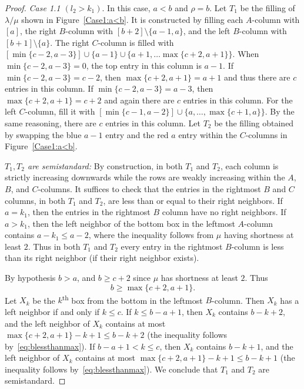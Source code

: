 \documentclass[ALCO,ThmDefs,Unicode,epreuves]{cedram}
\let\hypertargeta\hypertarget %
\newenvironment{Case}[1]{\par\vskip2pt\noindent%
\emph{#1}.}{\vskip2pt}
\begin{document}
\begin{proof}
\begin{Case}
{\hypertargeta{theo3.13_case1.1}{Case 1.1} $(l_2 > k_1)$} In this case, $a<b$ and $\rho = b$. Let $T_1$ be the filling of $\lambda/\mu$ shown in Figure~\ref{Case1:a<b}. It is constructed by filling each $A$-column with $[a]$, the right $B$-column with $[b+2]\setminus \{a-1,a\}$, and the left $B$-column with $[b+1]\setminus \{a\}$. The right $C$-column is filled with $[\min\{c-2,a-3\}] \cup \{a-1\} \cup \{a+1,\ldots \max\{c+2,a+1\}\}$. When $\min\{c-2,a-3\}= 0$, the top entry in this column is $a-1$. If $\min\{c-2,a-3\} = c-2$, then $\max\{c+2,a+1\} = a+1$ and thus there are $c$ entries in this column. If $\min\{c-2,a-3\} = a-3$, then $\max\{c+2,a+1\} = c+2$ and again there are $c$ entries in this column. For the left $C$-column, fill it with $[\min\{c-1,a-2\}]\cup \{a,\ldots, \max\{c+1,a\}\}$. By the same reasoning, there are $c$ entries in this column. Let $T_2$ be the filling obtained by swapping the blue $a-1$ entry and the red $a$ entry within the $C$-columns in Figure~\ref{Case1:a<b}. 

\emph{$T_1, T_2$ are semistandard:} By construction, in both $T_1$ and $T_2$, each column is strictly increasing downwards while the rows are weakly increasing within the $A$, $B$, and $C$-columns. It suffices to check that the entries in the rightmost $B$ and $C$ columns, in both $T_1$ and $T_2$, are less than or equal to their right neighbors. If $a=k_1$, then the entries in the rightmost $B$ column have no right neighbors. If $a > k_1$, then the left neighbor of the bottom box in the leftmost $A$-column contains $a - k_1 \leq a - 2$, where the inequality follows from $\mu$ having shortness at least $2$. Thus in both $T_1$ and $T_2$ every entry in the rightmost $B$-column is less than its right neighbor (if their right neighbor exists). 

By hypothesis $b>a$, and $b \geq c+2$ since $\mu$ has shortness at least $2$. Thus 
\begin{equation}
\label{eq:blessthanmax}
b \geq \max\{c+2,a+1\}.
\end{equation}
Let $X_k$ be the $k$\textsuperscript{th} box from the bottom in the leftmost $B$-column. Then $X_k$ has a left neighbor if and only if $k \leq c$. If $k \leq b-a + 1$, then $X_k$ contains $b-k+2$, and the left neighbor of $X_k$ contains at most $\max\{c+2,a+1\}-k+1 \leq b-k+2$ (the inequality follows by~\eqref{eq:blessthanmax}). If $b-a+1 < k \leq c$, then $X_k$ contains $b-k+1$, and the left neighbor of $X_k$ contains at most $\max\{c+2,a+1\}-k+1 \leq b-k+1$ (the inequality follows by~\eqref{eq:blessthanmax}). We conclude that $T_1$ and $T_2$ are semistandard.




\end{Case}
\end{proof}
\end{document}
